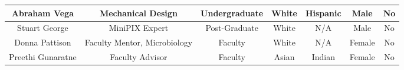 \begin{appendices}
\begin{table}[h!]
\begin{tabular}  {ccccccc}
      Abraham Vega & Mechanical Design & Undergraduate & White & Hispanic & Male & No \\ \hline
	  Stuart George & MiniPIX Expert & Post-Graduate & White & N/A & Male & No \\ \hline
	  Donna Pattison & Faculty Mentor, Microbiology & Faculty & White & N/A & Female & No \\ \hline
	  Preethi Gunaratne & Faculty Advisor & Faculty & Asian & Indian & Female & No \\ \hline
	\end{tabular}	
  \end{table}  

  \section{}

\end{appendices}
